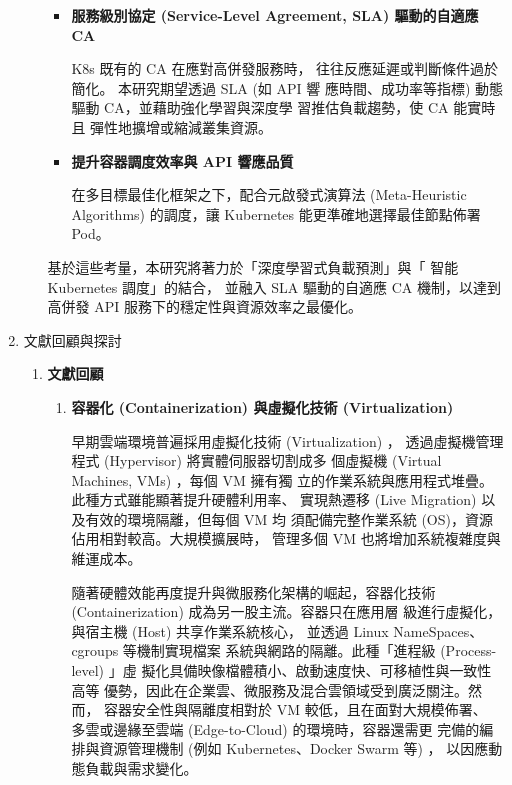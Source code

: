 \documentclass[12pt,a4paper]{article}
\begin{document}
\begin{enumerate}[label={(\zhdig*)}, leftmargin=2\parindent, listparindent=\parindent]
\begin{enumerate}[label={(\arabic*)}, leftmargin=\parindent, listparindent=\parindent]
\begin{itemize}[leftmargin=\parindent, listparindent=\parindent]
    \item\textbf{服務級別協定 (Service-Level Agreement, SLA) 驅動的自適應 CA}

K8s 既有的 CA 在應對高併發服務時，
往往反應延遲或判斷條件過於簡化。
本研究期望透過 SLA (如 API 響
應時間、成功率等指標) 動態驅動
CA，並藉助強化學習與深度學
習推估負載趨勢，使 CA 能實時且
彈性地擴增或縮減叢集資源。

    \item\textbf{提升容器調度效率與 API 響應品質}

在多目標最佳化框架之下，配合元啟發式演算法 (Meta-Heuristic Algorithms)
的調度，讓 Kubernetes 能更準確地選擇最佳節點佈署 Pod。

\end{itemize}

基於這些考量，本研究將著力於「深度學習式負載預測」與「 智能 Kubernetes 調度」的結合，
並融入 SLA 驅動的自適應 CA 機制，以達到高併發 API 服務下的穩定性與資源效率之最優化。

\end{enumerate}
\item 文獻回顧與探討

\begin{enumerate}[label={(\arabic*)}, leftmargin=\parindent, listparindent=\parindent]
\item \textbf{文獻回顧}
\begin{enumerate}[label={(\zhdig*)}, leftmargin=\parindent, listparindent=\parindent]

\item\textbf{容器化 (Containerization) \cite{9}與虛擬化技術
    (Virtualization) \cite{8}}

早期雲端環境普遍採用虛擬化技術 (Virtualization) ，
透過虛擬機管理程式 (Hypervisor) 將實體伺服器切割成多
個虛擬機 (Virtual Machines, VMs) ，每個 VM 擁有獨
立的作業系統與應用程式堆疊。此種方式雖能顯著提升硬體利用率、
實現熱遷移 (Live Migration) 以及有效的環境隔離，但每個 VM 均
須配備完整作業系統 (OS)，資源佔用相對較高。大規模擴展時，
管理多個 VM 也將增加系統複雜度與維運成本。

隨著硬體效能再度提升與微服務化架構的崛起，容器化技術
(Containerization) 成為另一股主流。容器只在應用層
級進行虛擬化，與宿主機 (Host) 共享作業系統核心，
並透過 Linux NameSpaces、cgroups 等機制實現檔案
系統與網路的隔離。此種「進程級 (Process-level) 」虛
擬化具備映像檔體積小、啟動速度快、可移植性與一致性高等
優勢，因此在企業雲、微服務及混合雲領域受到廣泛關注。然而，
容器安全性與隔離度相對於 VM 較低，且在面對大規模佈署、
多雲或邊緣至雲端 (Edge-to-Cloud) 的環境時，容器還需更
完備的編排與資源管理機制 (例如 Kubernetes、Docker Swarm 等) ，
以因應動態負載與需求變化。


\end{enumerate}
\end{enumerate}
\end{enumerate}
\end{document}
